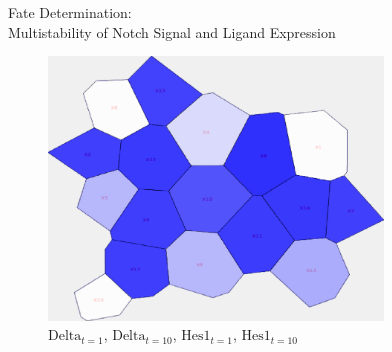 \documentclass[xelatex]{beamer}
\newlength{\colwidth}
\begin{document}
\begin{frame}[t]
\begin{columns}[t]
\begin{column}{\colwidth}
\begin{alertblock}{Fate Determination: \\ Multistability of Notch Signal and Ligand Expression}
\begin{figure}
\begin{minipage}{0.22\textwidth}
	\end{minipage}
	\begin{minipage}{0.22\textwidth}
		\includegraphics[height=7cm]{Image/Simulation_Hes1_end}
	\end{minipage}
	\caption{$\text{Delta}_{t=1}$, $\text{Delta}_{t=10}$,
		$\text{Hes1}_{t=1}$, $\text{Hes1}_{t=10}$}
\end{figure}

  \end{alertblock}


\end{column}
\end{columns}
\end{frame}
\end{document}
